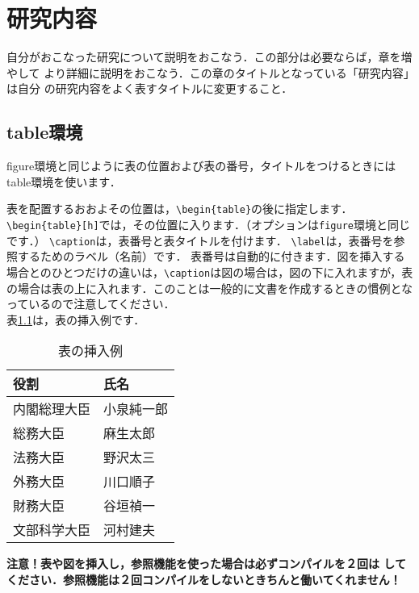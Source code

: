 \chapter{研究内容}
自分がおこなった研究について説明をおこなう．この部分は必要ならば，章を増やして
より詳細に説明をおこなう．この章のタイトルとなっている「研究内容」は自分
の研究内容をよく表すタイトルに変更すること．

\section{table環境}
figure環境と同じように表の位置および表の番号，タイトルをつけるときには
table環境を使います．

表を配置するおおよその位置は，\verb/\begin{table}/の後に指定します．
\verb/\begin{table}[h]/では，その位置に入ります．（オプションは\verb+figure+環境と同じです．）
\verb/\caption/は，表番号と表タイトルを付けます．
\verb/\label/は，表番号を参照するためのラベル（名前）です．
表番号は自動的に付きます．図を挿入する場合とのひとつだけの違いは，\verb+\caption+は図の場合は，図の下に入れますが，表の場合は表の上に入れます．このことは一般的に文書を作成するときの慣例となっているので注意してください．\\

表\ref{table_sample}は，表の挿入例です．

\begin{table}[h]
\begin{center}
\caption{表の挿入例}
\begin{tabular}{|l|l|}
\hline
役割 & 氏名\\
\hline
\hline
内閣総理大臣 & 小泉純一郎\\
\hline
総務大臣 & 麻生太郎\\
\hline
法務大臣 & 野沢太三\\
\hline
外務大臣 & 川口順子\\
\hline
財務大臣 & 谷垣禎一\\
\hline
文部科学大臣 & 河村建夫\\
\hline
\end{tabular}
\end{center}
\label{table_sample}
\end{table}

{\bf 注意！表や図を挿入し，参照機能を使った場合は必ずコンパイルを２回は
してください．参照機能は２回コンパイルをしないときちんと働いてくれません！}
